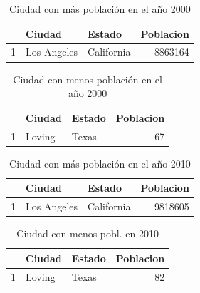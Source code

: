\begin{table}[ht]
\centering
\begin{tabular}{rllr}
  \hline
 & Ciudad & Estado & Poblacion \\ 
  \hline
1 & Los Angeles & California & 8863164 \\ 
   \hline
\end{tabular}
\caption{Ciudad con más población en el año 2000} 
\end{table}


\begin{table}[ht]
\centering
\begin{tabular}{rllr}
  \hline
 & Ciudad & Estado & Poblacion \\ 
  \hline
1 & Loving & Texas &  67 \\ 
   \hline
\end{tabular}
\caption{Ciudad con menos población en el año 2000} 
\end{table}


\begin{table}[ht]
\centering
\begin{tabular}{rllr}
  \hline
 & Ciudad & Estado & Poblacion \\ 
  \hline
1 & Los Angeles & California & 9818605 \\ 
   \hline
\end{tabular}
\caption{Ciudad con más población en el año 2010} 
\end{table}


\begin{table}[ht]
\centering
\begin{tabular}{rllr}
  \hline
 & Ciudad & Estado & Poblacion \\ 
  \hline
1 & Loving & Texas &  82 \\ 
   \hline
\end{tabular}
\caption{Ciudad con menos pobl. en 2010} 
\end{table}


